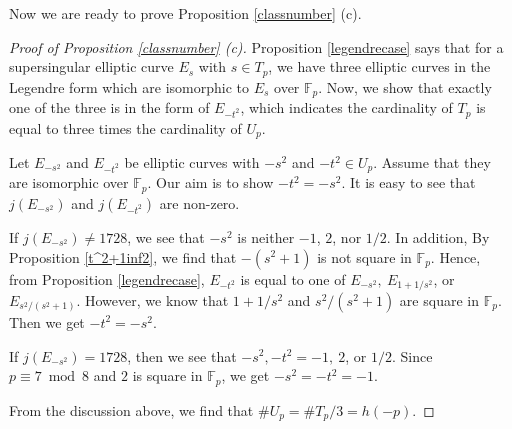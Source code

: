 \documentclass[10pt,a4paper]{amsart}
\theoremstyle{plain}
\newcommand{\fp}{\mathbb{F}_p}
\begin{document}
Now we are ready to prove Proposition \ref{classnumber} (c).
\begin{proof}[Proof of Proposition \ref{classnumber} \rm{(c)}]
Proposition \ref{legendrecase} says that for a supersingular elliptic curve $E_s$ with $s \in T_p$, we have three elliptic curves in the Legendre form which are isomorphic to $E_s$ over $\fp$. Now, we show that exactly one of the three is in the form of $E_{-t^2}$, which indicates the cardinality of $T_p$ is equal to three times the cardinality of $U_p$.

 Let $E_{-s^2}$ and $ E_{-t^2}$ be elliptic curves with $-s^2$ and $-t^2 \in U_p$. Assume that they are isomorphic over $\fp$. Our aim is to show $-t^2=-s^2$. 
It is easy to see that $j(E_{-s^2})$ and $j(E_{-t^2})$ are non-zero.
    
    If $j(E_{-s^2})\neq 1728$, we see that $-s^2$ is neither $-1$, $2$, nor $1/2$. In addition, By Proposition \ref{t^2+1inf2}, we find that $-(s^2+1)$ is not square in $\fp$. Hence, from Proposition \ref{legendrecase}, $E_{-t^2}$ is equal to one of $E_{-s^2},\ E_{1+1/{s^2}}$, or $E_{s^2/(s^2+1)}$. However, we know that $1+1/s^2$ and $s^2/(s^2+1)$ are square in $\fp$. Then we get $-t^2=-s^2$.
    
    If $j(E_{-s^2})=1728$, then we see that $-s^2,-t^2=-1,\ 2$, or $1/2$. Since $p \equiv 7 \bmod 8$ and $2$ is square in $\fp$, we get $-s^2=-t^2=-1$.
    
    From the discussion above, we find that $\# U_p=\# T_p/3=h(-p)$.
\end{proof}
\end{document}
